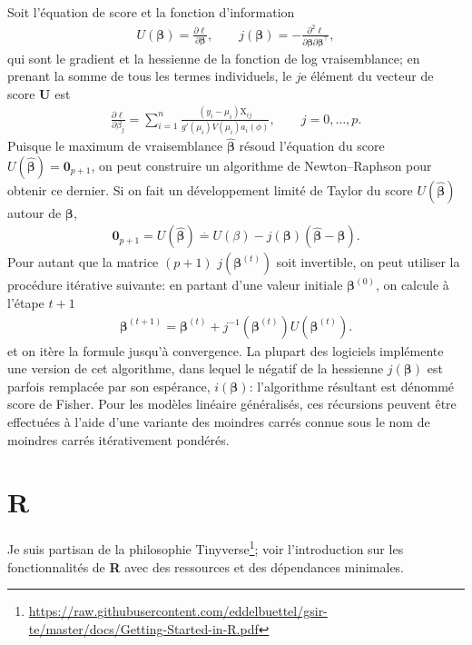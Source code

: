 \documentclass[
  11pt,
  letterpaper,
]{article}
\renewcommand{\href}[2]{#2\footnote{\url{#1}}}
\theoremstyle{definition}
\theoremstyle{definition}
\theoremstyle{definition}
\theoremstyle{definition}
\theoremstyle{remark}
\begin{document}
Soit l'équation de score et la fonction d'information
\begin{align*}
U(\boldsymbol{\beta}) = \frac{\partial \ell}{\partial \boldsymbol{\beta}}, \qquad j(\boldsymbol{\beta}) = - \frac{\partial^2 \ell}{\partial \boldsymbol{\beta} \partial \boldsymbol{\beta}^\top},
\end{align*}
qui sont le gradient et la hessienne de la fonction de log vraisemblance; en prenant la somme de tous les termes individuels, le \(j\)e élément du vecteur de score \(\boldsymbol{U}\) est
\begin{align*}
\frac{\partial \ell}{\partial \beta_j} = \sum_{i=1}^n \frac{(y_i-\mu_i)\mathrm{X}_{ij}}{g'(\mu_i)V(\mu_i)a_i(\phi)}, \qquad j=0, \ldots, p.
\end{align*}
Puisque le maximum de vraisemblance \(\widehat{\boldsymbol{\beta}}\) résoud l'équation du score \(U(\widehat{\boldsymbol{\beta}})=\boldsymbol{0}_{p+1}\), on peut construire un algorithme de Newton--Raphson pour obtenir ce dernier. Si on fait un développement limité de Taylor du score \(U(\widehat{\boldsymbol{\beta}})\) autour de \(\boldsymbol{\beta}\),
\begin{align*}
\boldsymbol{0}_{p+1} = U(\widehat{\boldsymbol{\beta}}) \stackrel{\cdot}{=} U(\beta) - j(\boldsymbol{\beta}) (\widehat{\boldsymbol{\beta}}-\boldsymbol{\beta}).
\end{align*}
Pour autant que la matrice \((p+1)\) \(j(\boldsymbol{\beta}^{(t)})\) soit invertible, on peut utiliser la procédure itérative suivante: en partant d'une valeur initiale \(\boldsymbol{\beta}^{(0)}\), on calcule à l'étape \(t+1\)
\begin{align*}
\boldsymbol{\beta}^{(t+1)} = \boldsymbol{\beta}^{(t)} + j^{-1}(\boldsymbol{\beta}^{(t)})U(\boldsymbol{\beta}^{(t)}).
\end{align*}
et on itère la formule jusqu'à convergence. La plupart des logiciels implémente une version de cet algorithme, dans lequel le négatif de la hessienne \(j(\boldsymbol{\beta})\) est parfois remplacée par son espérance, \(i(\boldsymbol{\beta})\): l'algorithme résultant est dénommé score de Fisher. Pour les modèles linéaire généralisés, ces récursions peuvent être effectuées à l'aide d'une variante des moindres carrés connue sous le nom de moindres carrés itérativement pondérés.

\hypertarget{r}{%
\section*{\texorpdfstring{\textbf{R}}{R}}\label{r}}

Je suis partisan de la \href{https://raw.githubusercontent.com/eddelbuettel/gsir-te/master/docs/Getting-Started-in-R.pdf}{philosophie Tinyverse}; voir l'introduction sur les fonctionnalités de \textbf{R} avec des ressources et des dépendances minimales.

  
\end{document}
